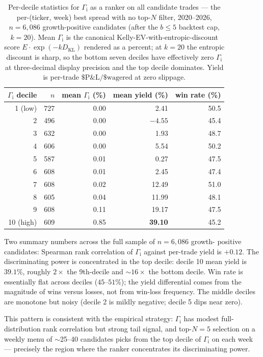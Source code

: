 \documentclass[11pt]{article}
\newcommand{\GROUND}{\Gamma_{\mathrm{i}}}
\begin{document}
\begin{table}[htbp]
\centering
\small
\begin{tabular}{rrrrr}
\toprule
$\GROUND$ decile & $n$ & mean $\GROUND$ (\%) & mean yield (\%) & win rate (\%) \\
\midrule
 1 (low)   & 727 &  0.00 &  2.41 & 50.5 \\
 2         & 496 &  0.00 & $-4.55$ & 45.4 \\
 3         & 632 &  0.00 &  1.93 & 48.7 \\
 4         & 606 &  0.00 &  5.54 & 50.2 \\
 5         & 587 &  0.01 &  0.27 & 47.5 \\
 6         & 608 &  0.01 &  2.45 & 47.4 \\
 7         & 608 &  0.02 & 12.49 & 51.0 \\
 8         & 605 &  0.04 & 11.99 & 48.1 \\
 9         & 608 &  0.11 & 19.17 & 47.5 \\
 10 (high) & 609 &  0.85 & \textbf{39.10} & 45.2 \\
\bottomrule
\end{tabular}
\caption{Per-decile statistics for $\GROUND$ as a ranker on all
candidate trades --- the per-(ticker, week) best spread with no top-$N$
filter, 2020--2026, $n = 6{,}086$ growth-positive candidates (after the
$b \le 5$ backtest cap, $k = 20$). Mean $\GROUND$ is the canonical
Kelly-EV-with-entropic-discount score
$E \cdot \exp(-k D_{\mathrm{KL}})$ rendered as a percent;
at $k = 20$ the entropic discount is sharp, so the bottom seven deciles
have effectively zero $\GROUND$ at three-decimal display precision and
the top decile dominates. Yield is per-trade
$\$\mathrm{P\&L} / \$\mathrm{wagered}$ at zero slippage.}
\label{tab:decile-stats}
\end{table}

Two summary numbers across the full sample of $n = 6{,}086$ growth-
positive candidates: Spearman rank correlation of $\GROUND$ against
per-trade yield is $+0.12$. The discriminating power is concentrated
in the top decile: decile 10 mean yield is $39.1\%$, roughly
$2{\times}$ the 9th-decile and $\sim 16{\times}$ the bottom decile.
Win rate is essentially flat across deciles ($45$--$51\%$); the yield
differential comes from the magnitude of wins versus losses, not from
win-loss frequency. The middle deciles are monotone but noisy
(decile 2 is mildly negative; decile 5 dips near zero).

This pattern is consistent with the empirical strategy: $\GROUND$ has
modest full-distribution rank correlation but strong tail signal, and
top-$N = 5$ selection on a weekly menu of $\sim$25--40 candidates
picks from the top decile of $\GROUND$ on each week --- precisely the
region where the ranker concentrates its discriminating power.
\end{document}
